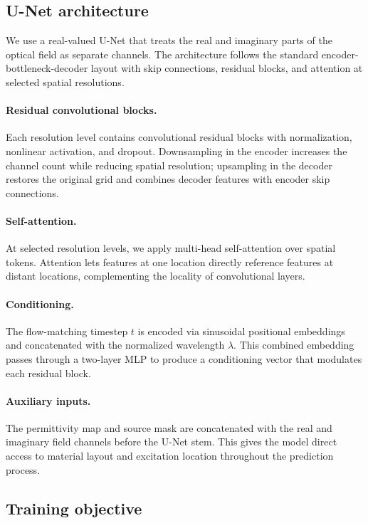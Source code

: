 \documentclass[%
 reprint,
 amsmath,amssymb,
 aps,
floatfix,
]{revtex4-2}
\begin{document}
%

\subsection{U-Net architecture}

We use a real-valued U-Net that treats the real and imaginary parts of the optical field as separate channels. The architecture follows the standard encoder-bottleneck-decoder layout with skip connections, residual blocks, and attention at selected spatial resolutions.

\paragraph{Residual convolutional blocks.}
Each resolution level contains convolutional residual blocks with normalization, nonlinear activation, and dropout. Downsampling in the encoder increases the channel count while reducing spatial resolution; upsampling in the decoder restores the original grid and combines decoder features with encoder skip connections.

\paragraph{Self-attention.}
At selected resolution levels, we apply multi-head self-attention over spatial tokens. Attention lets features at one location directly reference features at distant locations, complementing the locality of convolutional layers.

\paragraph{Conditioning.}
The flow-matching timestep $t$ is encoded via sinusoidal positional embeddings and concatenated with the normalized wavelength $\lambda$. This combined embedding passes through a two-layer MLP to produce a conditioning vector that modulates each residual block.

\paragraph{Auxiliary inputs.}
The permittivity map and source mask are concatenated with the real and imaginary field channels before the U-Net stem. This gives the model direct access to material layout and excitation location throughout the prediction process.

\subsection{Training objective}
\end{document}

